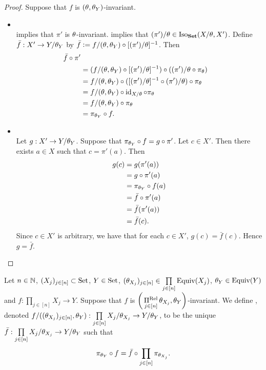 \begin{proof}
	Suppose that $f$ is $(\theta, \theta_Y)$-invariant. 
	\begin{itemize}
		\item {} \\
		 implies that $\pi'$ is $\theta$-invariant.  implies that $(\pi')/\theta \in \operatorname{Iso}_{\text{\textbf{Set}}}(X/\theta, X')$. Define $\bar{f}: X' \rightarrow Y/\theta_Y$ by  $\bar{f} \vcentcolon= f/(\theta, \theta_Y) \circ [(\pi')/\theta]^{-1}$. Then
		\begin{align*}
			\bar{f} \circ \pi' \\
			& = (f/(\theta, \theta_Y) \circ [(\pi')/\theta]^{-1}) \circ ((\pi')/\theta \circ \pi_{\theta}) \\
			& = f/(\theta, \theta_Y) \circ ([(\pi')/\theta]^{-1} \circ (\pi')/\theta) \circ \pi_{\theta} \\
			& = f/(\theta, \theta_Y) \circ \operatorname{id}_{X/\theta} \circ  \pi_{\theta} \\
			& = f/(\theta, \theta_Y) \circ \pi_{\theta} \\
			& = \pi_{\theta_Y} \circ f.  
		\end{align*} 
		\item {} \\
		Let $g: X' \rightarrow Y/\theta_Y$. Suppose that $\pi_{\theta_Y} \circ f = g \circ \pi'$. Let $c \in X'$. Then there exists $a \in X$ such that $c = \pi'(a)$. Then 
		\begin{align*}
			g(c)
			& = g(\pi'(a)) \\
			& = g \circ \pi'(a) \\
			& = \pi_{\theta_Y} \circ f(a) \\
			& = \bar{f} \circ \pi'(a) \\
			& = \bar{f}(\pi'(a)) \\
			& = \bar{f}(c).
		\end{align*}
		Since $c \in X'$ is arbitrary, we have that for each $c \in X'$, $g(c) = \bar{f}(c)$. Hence $g = \bar{f}$. 
	\end{itemize}
\end{proof}

\begin{defn}
	Let $n \in \mathbb{N}$, $(X_j)_{j \in [n]} \subset \text{Set}$, $Y \in \text{Set}$, $(\theta_{X_j})_{j \in [n]} \in \prod\limits_{j \in [n]} \operatorname*{\text{Equiv}}(X_j)$, $\theta_Y \in \operatorname*{\text{Equiv}}(Y)$ and $f:\prod\limits_{j \in [n]} X_j \rightarrow Y$. Suppose that $f$ is $\bigg(\operatorname*{\Pi^{\text{Rel}}}\limits_{j \in [n]} \theta_{X_j}, \theta_Y  \bigg)$-invariant. We define , denoted $f/((\theta_{X_j})_{j \in [n]}, \theta_Y): \prod\limits_{j \in [n]} X_j/\theta_{X_j} \rightarrow Y/\theta_Y$, to be the unique $\bar{f}: \prod\limits_{j \in [n]} X_j/\theta_{X_j} \rightarrow Y/\theta_Y$ such that 
	$$\pi_{\theta_Y} \circ f = \bar{f} \circ \prod\limits_{j \in [n]} \pi_{\theta_{X_j}}.$$
\end{defn}

